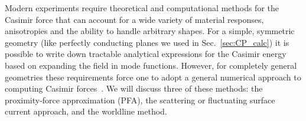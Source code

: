 Modern experiments require theoretical and computational methods
for the Casimir force that can account for a wide variety of material responses, anisotropies
and the ability to handle arbitrary shapes.  
For a simple, symmetric geometry (like perfectly conducting planes we used in Sec.~\ref{sec:CP_calc})
it is possible to write down tractable analytical expressions for
the Casimir energy based on expanding the field in mode functions.
However, for completely general geometries these requirements force one to adopt a general 
numerical approach to computing Casimir forces~\cite{Johnson2011}.
We will discuss three of these methods: the proximity-force approximation (PFA), the scattering
or fluctuating surface current approach, and the worldline method.


